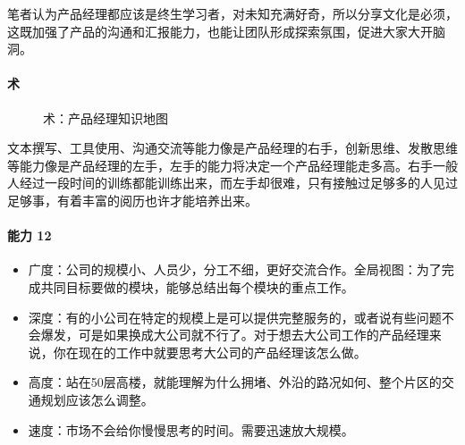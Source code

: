 \documentclass[letterpaper,10pt,english]{sphinxmanual}
\begin{document}
笔者认为产品经理都应该是终生学习者，对未知充满好奇，所以分享文化是必须，这既加强了产品的沟通和汇报能力，也能让团队形成探索氛围，促进大家大开脑洞。


\paragraph{术}
\label{\detokenize{chapter_introduction/ability:id7}}
\begin{figure}[H]
\centering
\capstart

\noindent{}
\caption{术：产品经理知识地图}\label{\detokenize{chapter_introduction/ability:id20}}\end{figure}

文本撰写、工具使用、沟通交流等能力像是产品经理的右手，创新思维、发散思维等能力像是产品经理的左手，左手的能力将决定一个产品经理能走多高。右手一般人经过一段时间的训练都能训练出来，而左手却很难，只有接触过足够多的人见过足够事，有着丰富的阅历也许才能培养出来。
%
\begin{footnote}[342]\sphinxAtStartFootnote
{}
%
\end{footnote}


\paragraph{能力 12\sphinxfootnotemark[343]}
\label{\detokenize{chapter_introduction/ability:id8}}%
\begin{footnotetext}[343]\sphinxAtStartFootnote
{}
%
\end{footnotetext}\ignorespaces \begin{itemize}
\item {} 
广度：公司的规模小、人员少，分工不细，更好交流合作。全局视图：为了完成共同目标要做的模块，能够总结出每个模块的重点工作。

\item {} 
深度：有的小公司在特定的规模上是可以提供完整服务的，或者说有些问题不会爆发，可是如果换成大公司就不行了。对于想去大公司工作的产品经理来说，你在现在的工作中就要思考大公司的产品经理该怎么做。

\item {} 
高度：站在50层高楼，就能理解为什么拥堵、外沿的路况如何、整个片区的交通规划应该怎么调整。

\item {} 
速度：市场不会给你慢慢思考的时间。需要迅速放大规模。

\end{itemize}
\end{document}
